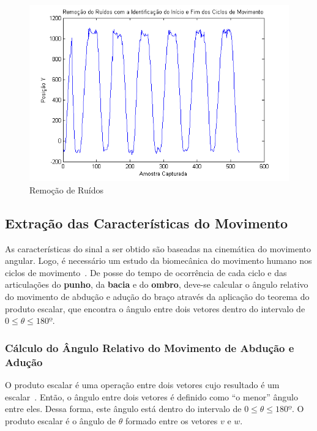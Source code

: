 \begin{figure}[!htb]
     \centering
     \includegraphics[width=1\textwidth]{./img/remocaoruidociclo.png}
     \caption{Remoção de Ruídos}
     \label{img:remocaoruidossinal}
\end{figure}


\subsection{Extração das Características do Movimento} \label{sec:extracao_caracteristcas}
As características do sinal a ser obtido são baseadas na cinemática do movimento angular. Logo, é necessário um estudo da biomecânica do movimento humano nos ciclos de movimento~\cite{hamill1999bases}. De posse do tempo de ocorrência de cada ciclo e das articulações do \textbf{punho}, da \textbf{bacia} e do \textbf{ombro}, deve-se calcular o ângulo relativo do movimento de abdução e adução do braço através da aplicação do teorema do produto escalar, que encontra o ângulo entre dois vetores dentro do intervalo de $0 \leq \theta \leq 180º$.

\subsubsection{Cálculo do Ângulo Relativo do Movimento de Abdução e Adução}\label{section:movimento_abducao}
O produto escalar é uma operação entre dois vetores cujo resultado é um escalar~\cite{algebra90}. Então, o ângulo entre dois vetores é definido como ``o menor'' ângulo entre eles. Dessa forma, este ângulo está dentro do intervalo de $0 \leq \theta \leq 180º $. O produto escalar é o ângulo de $ \theta$ formado entre os vetores $ v $ e $ w $.


